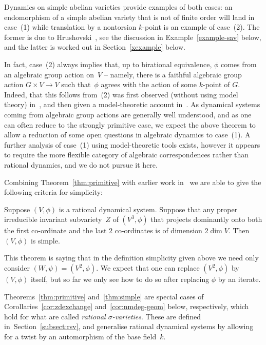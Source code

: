 \documentclass[\DocOpts]{amsart}
\theoremstyle{definition}
\newenvironment{customthm}[1]
  {\renewcommand\theinnercustomthm{#1}\innercustomthm}
  {\endinnercustomthm}
\newcommand{\<}{\langle}
\renewcommand{\>}{\rangle}
\begin{document}
Dynamics on simple abelian varieties provide examples of both cases: an endomorphism of a simple abelian variety that is not of finite order will land in case~(1) while translation by a nontorsion $k$-point is an example of case~(2).
The former is due to Hrushovski~\cite{mm}, see the discussion in Example~\ref{example-sav} below, and the latter is worked out in Section~\ref{xexample} below.

In fact, case~(2) always implies that, up to birational equivalence, $\phi$ comes from an algebraic group action on~$V$ --  namely, there is a faithful algebraic group action $G\times V\to V$ such that~$\phi$ agrees with the action of some $k$-point of $G$.
Indeed, that this follows from~(2) was first observed (without using model theory) in~\cite[Corollary~A]{bms}, and then given a model-theoretic account in~\cite[Theorem~5.1]{qfint}.
As dynamical systems coming from algebraic group actions are generally well understood,
and as one can often reduce to the strongly primitive case, we expect the above theorem to allow a reduction of some open questions in algebraic dynamics to case~(1).
A further analysis of case~(1) using model-theoretic tools exists, however it appears to require the more flexible category of algebraic correspondences rather than rational dynamics, and we do not pursue it here.

Combining Theorem~\ref{thm:primitive} with earlier work in~\cite{qfint} we are able to give the following criteria for simplicity:

\begin{customthm}{3}
\label{thm:simple}
Suppose $(V,\phi)$ is a rational dynamical system.
Suppose that any proper irreducible invariant subvariety~$Z$ of $(V^3,\phi)$ that projects dominantly onto both the first co-ordinate and the last $2$ co-ordinates is of dimension $2\dim V$.
Then $(V,\phi)$ is simple.
\end{customthm}

This theorem is saying that in the definition simplicity given above we need only consider $(W,\psi)=(V^2,\phi)$.
We expect that one can replace $(V^2,\phi)$ by $(V,\phi)$ itself, but so far we only see how to do so after replacing $\phi$ by an iterate.

Theorems~\ref{thm:primitive} and~\ref{thm:simple} are special cases of Corollaries~\ref{cor:zdexchange} and~\ref{cor:nmdeg-geom} below, respectively, which hold for what are called {\em rational $\sigma$-varieties}.
These are defined in~Section~\ref{subsect:rsv}, and generalise rational dynamical systems by allowing for a twist by an automorphism of the base field~$k$.
\end{document}
